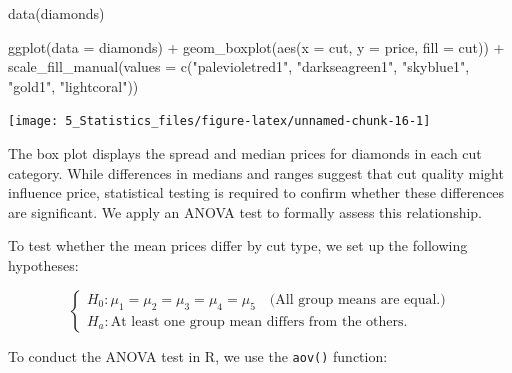 \documentclass[
  11pt,
]{book}
\makeatletter
\newenvironment{Shaded}{}{}
\newcommand{\AttributeTok}[1]{#1}
\newcommand{\FunctionTok}[1]{#1}
\newcommand{\NormalTok}[1]{#1}
\newcommand{\SpecialCharTok}[1]{\textcolor[rgb]{0.39,0.39,0.39}{#1}}
\newcommand{\StringTok}[1]{\textcolor[rgb]{0.39,0.39,0.39}{#1}}
\newenvironment{kframe}{%
\medskip{}
\setlength{\fboxsep}{.8em}
 \def\at@end@of@kframe{}%
 \ifinner\ifhmode%
  \def\at@end@of@kframe{\end{minipage}}%
  \begin{minipage}{\columnwidth}%
 \fi\fi%
 \def\FrameCommand##1{\hskip\@totalleftmargin \hskip-\fboxsep
 \colorbox{shadecolor}{##1}\hskip-\fboxsep
     \hskip-\linewidth \hskip-\@totalleftmargin \hskip\columnwidth}%
 \MakeFramed {\advance\hsize-\width
   \@totalleftmargin\z@ \linewidth\hsize
   \@setminipage}}%
 {\par\unskip\endMakeFramed%
 \at@end@of@kframe}
\renewenvironment{Shaded}{\begin{kframe}}{\end{kframe}}
\theoremstyle{definition}
\theoremstyle{definition}
\theoremstyle{definition}
\theoremstyle{definition}
\theoremstyle{remark}
\makeatother
\begin{document}
\begin{Shaded}
\begin{Highlighting}[]
\FunctionTok{data}\NormalTok{(diamonds)   }

\FunctionTok{ggplot}\NormalTok{(}\AttributeTok{data =}\NormalTok{ diamonds) }\SpecialCharTok{+} 
  \FunctionTok{geom\_boxplot}\NormalTok{(}\FunctionTok{aes}\NormalTok{(}\AttributeTok{x =}\NormalTok{ cut, }\AttributeTok{y =}\NormalTok{ price, }\AttributeTok{fill =}\NormalTok{ cut)) }\SpecialCharTok{+}
  \FunctionTok{scale\_fill\_manual}\NormalTok{(}\AttributeTok{values =} \FunctionTok{c}\NormalTok{(}\StringTok{"palevioletred1"}\NormalTok{, }\StringTok{"darkseagreen1"}\NormalTok{, }\StringTok{"skyblue1"}\NormalTok{, }\StringTok{"gold1"}\NormalTok{, }\StringTok{"lightcoral"}\NormalTok{))}
\end{Highlighting}
\end{Shaded}

\begin{center}\texttt{[image: 5\_Statistics\_files/figure-latex/unnamed-chunk-16-1]} \end{center}

The box plot displays the spread and median prices for diamonds in each cut category. While differences in medians and ranges suggest that cut quality might influence price, statistical testing is required to confirm whether these differences are significant. We apply an ANOVA test to formally assess this relationship.

To test whether the mean prices differ by cut type, we set up the following hypotheses:

\[
\begin{cases}
    H_0: \mu_1 = \mu_2 = \mu_3 = \mu_4 = \mu_5 \quad \text{(All group means are equal.)} \\
    H_a: \text{At least one group mean differs from the others.}  
\end{cases}
\]

To conduct the ANOVA test in R, we use the \texttt{aov()} function:
\end{document}
